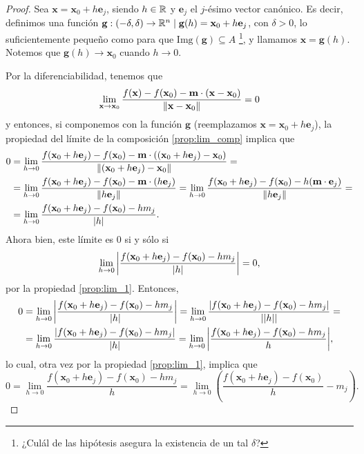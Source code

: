  \begin{proof} Sea $\mathbf{x} = \mathbf{x}_0 + h \mathbf{e}_j$, siendo $h \in \mathbb{R}$ y $\mathbf{e}_j$ el $j$-\'esimo vector can\'onico. Es decir, definimos una funci\'on $\mathbf{g}:(-\delta,\delta) \to \mathbb{R}^n\;|\; \mathbf{g}(h) = \mathbf{x}_0 + h \mathbf{e}_j$, con $\delta > 0$, lo suficientemente peque\~{n}o como para que $\text{Img}(\mathbf{g})  \subseteq  A$ \footnote{¿Cul\'al de las hip\'otesis asegura la existencia de un tal $\delta$?}, y llamamos $\mathbf{x} = \mathbf{g}(h)$. Notemos que $\mathbf{g}(h) \to \mathbf{x}_0$ cuando $h \to 0$. 

Por la diferenciabilidad, tenemos que 
\[
 \lim_{\mathbf{x} \to \mathbf{x}_0} \frac{f(\mathbf{x}) - f(\mathbf{x}_0) - \mathbf{m} \cdot (\mathbf{x} - \mathbf{x}_0)}
                                 {\norm{\mathbf{x} - \mathbf{x}_0}} = 0
\]
y entonces, si componemos con la funci\'on $\mathbf{g}$ (reemplazamos $\mathbf{x} = \mathbf{x}_0 + h \mathbf{e}_j$), la propiedad del l\'imite de la composici\'on \eqref{prop:lim_comp} implica que
\begin{align*}
  0 & = \lim_{h \to 0} \frac{f(\mathbf{x}_0 + h \mathbf{e}_j) - f(\mathbf{x}_0) - \mathbf{m} \cdot ((\mathbf{x}_0 + h\mathbf{e}_j) - \mathbf{x}_0)}
                                 {\norm{(\mathbf{x}_0 + h\mathbf{e}_j) - \mathbf{x}_0}} = \\
    & = \lim_{h \to 0} \frac{f(\mathbf{x}_0 + h \mathbf{e}_j) - f(\mathbf{x}_0) - \mathbf{m} \cdot (h\mathbf{e}_j)}{\norm{h \mathbf{e}_j}} = \lim_{h \to 0} \frac{f(\mathbf{x}_0 + h \mathbf{e}_j) - f(\mathbf{x}_0) - h(\mathbf{m} \cdot \mathbf{e}_j)}{\norm{h \mathbf{e}_j}} =\\
    & = \lim_{h \to 0} \frac{f(\mathbf{x}_0 + h \mathbf{e}_j) - f(\mathbf{x}_0) - h m_j}{\abs{h}} .
\end{align*}                                
Ahora bien, este l\'imite es $0$ si y s\'olo si
\[
 \lim_{h \to 0} \abs{ \frac{f(\mathbf{x}_0 + h \mathbf{e}_j) - f(\mathbf{x}_0) - h m_j}{\abs{h}} } = 0,
\]
por la propiedad \eqref{prop:lim_1}. Entonces,
\begin{align*}
  0 & = \lim_{h \to 0} \abs{ \frac{f(\mathbf{x}_0 + h \mathbf{e}_j) - f(\mathbf{x}_0) - h m_j}{\abs{h}} }
      = \lim_{h \to 0} \frac{\abs{f(\mathbf{x}_0 + h \mathbf{e}_j) - f(\mathbf{x}_0) - h m_j}}{\abs{\abs{h}}} = \\
    & = \lim_{h \to 0} \frac{\abs{f(\mathbf{x}_0 + h \mathbf{e}_j) - f(\mathbf{x}_0) - h m_j}}{\abs{h}}
      = \lim_{h \to 0} \abs{ \frac{f(\mathbf{x}_0 + h \mathbf{e}_j) - f(\mathbf{x}_0) - h m_j}{h} },
\end{align*} 
lo cual, otra vez por la propiedad \eqref{prop:lim_1}, implica que 
\[
 0 = \lim_{h \to 0} \frac{f(\mathbf{x}_0 + h \mathbf{e}_j) - f(\mathbf{x}_0) - h m_j}{h} =
     \lim_{h \to 0} \left( \frac{f(\mathbf{x}_0 + h \mathbf{e}_j) - f(\mathbf{x}_0)}{h} - m_j \right) .
\]


\end{proof}
